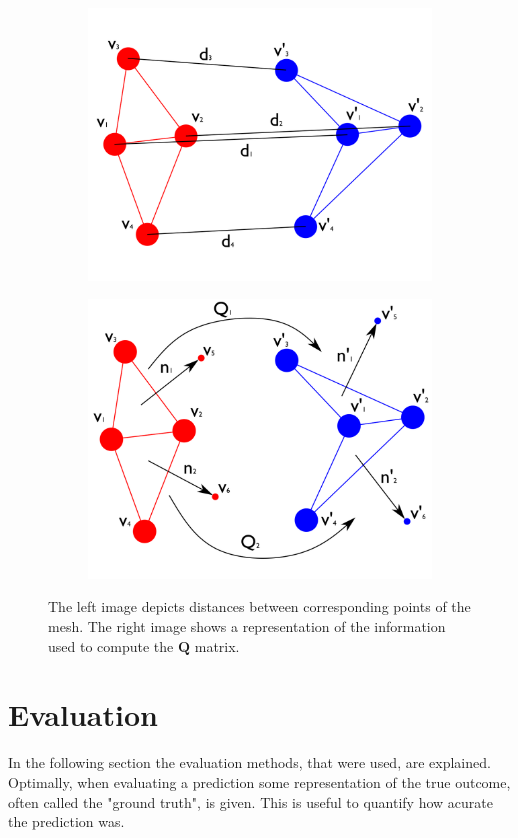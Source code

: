 \begin{figure}
\centering
\begin{subfigure}{.5\textwidth}
  \centering
  \includegraphics[width=.75\linewidth]{figures/pediag}
\end{subfigure}%
\begin{subfigure}{.5\textwidth}
  \centering
  \includegraphics[width=.75\linewidth]{figures/dediag}
\end{subfigure}
\caption{The left image depicts distances between corresponding points of the mesh. The right image shows a representation of the information used to compute the $\mathbf{Q}$ matrix.}
\label{fig:errordiag}
\end{figure}

\section{Evaluation}
In the following section the evaluation methods, that were used, are explained. Optimally, when evaluating a prediction some representation of the true outcome, often called the "ground truth", is given. This is useful to quantify how acurate the prediction was.
